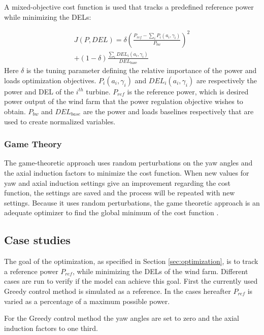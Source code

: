 A mixed-objective cost function is used that tracks a predefined reference power while minimizing the DELs: 

\begin{equation}
\begin{aligned}
J(P,DEL) = \delta\left(\frac{P_{ref}-\sum\nolimits_i P_i(a_i,\gamma_i)}{P_{bw}}\right)^2 \\ +
 (1-\delta)\frac{\sum\nolimits_i DEL_i(a_i,\gamma_i)}{DEL_\text{{base}}}
\end{aligned}
 \label{eq:costf}
\end{equation}
Here $\delta$ is the tuning parameter defining the relative importance of the power and loads optimization objectives. $P_i(a_i,\gamma_i)$ and $DEL_i(a_i,\gamma_i)$ are respectively the power and DEL of the $i^{th}$ turbine. $P_{ref}$ is the reference power, which is desired power output of the wind farm that the power regulation objective wishes to obtain. $P_{bw}$ and $DEL_{base}$ are the power and loads baselines respectively  that are used to create normalized variables.


\subsubsection{Game Theory} \label{sec:gametheory}
The game-theoretic approach uses random perturbations on the yaw angles and the axial induction factors to minimize the cost function. When new values for yaw and axial induction settings give an improvement regarding the cost function, the settings are saved and the process will be repeated with new settings. Because it uses random perturbations, the game theoretic approach is an adequate optimizer to find the global minimum of the cost function \cite{Dijk2016}.

\subsection{Case studies}
\label{sec:Case studies}
The goal of the optimization, as specified in Section \ref{sec:optimization}, is to track a reference power $P_{ref}$, while minimizing the DELs of the wind farm. Different cases are run to verify if the model can achieve this goal. First the currently used Greedy control method is simulated as a reference. In the cases hereafter $P_{ref}$ is varied as a percentage of a maximum possible power.

For the Greedy control method the yaw angles are set to zero and the axial induction factors to one third. 

